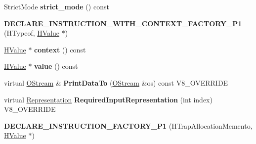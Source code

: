 \begin{DoxyCompactItemize}
\item 
\hypertarget{classv8_1_1internal_1_1_v8___f_i_n_a_l_a2aedf779fef90f5fec7b463341d87c42}{}Strict\+Mode {\bfseries strict\+\_\+mode} () const \label{classv8_1_1internal_1_1_v8___f_i_n_a_l_a2aedf779fef90f5fec7b463341d87c42}

\item 
\hypertarget{classv8_1_1internal_1_1_v8___f_i_n_a_l_a1b1a4e623508cb63ed8e01ba66e0dc85}{}{\bfseries D\+E\+C\+L\+A\+R\+E\+\_\+\+I\+N\+S\+T\+R\+U\+C\+T\+I\+O\+N\+\_\+\+W\+I\+T\+H\+\_\+\+C\+O\+N\+T\+E\+X\+T\+\_\+\+F\+A\+C\+T\+O\+R\+Y\+\_\+\+P1} (H\+Typeof, \hyperlink{classv8_1_1internal_1_1_h_value}{H\+Value} $\ast$)\label{classv8_1_1internal_1_1_v8___f_i_n_a_l_a1b1a4e623508cb63ed8e01ba66e0dc85}

\item 
\hypertarget{classv8_1_1internal_1_1_v8___f_i_n_a_l_a8294bece2df148267ec52228e2139030}{}\hyperlink{classv8_1_1internal_1_1_h_value}{H\+Value} $\ast$ {\bfseries context} () const \label{classv8_1_1internal_1_1_v8___f_i_n_a_l_a8294bece2df148267ec52228e2139030}

\item 
\hypertarget{classv8_1_1internal_1_1_v8___f_i_n_a_l_a998b3feae0e84bbe080297551603911f}{}\hyperlink{classv8_1_1internal_1_1_h_value}{H\+Value} $\ast$ {\bfseries value} () const \label{classv8_1_1internal_1_1_v8___f_i_n_a_l_a998b3feae0e84bbe080297551603911f}

\item 
\hypertarget{classv8_1_1internal_1_1_v8___f_i_n_a_l_ac450dad970b14246be761ccf5004924b}{}virtual \hyperlink{classv8_1_1internal_1_1_o_stream}{O\+Stream} \& {\bfseries Print\+Data\+To} (\hyperlink{classv8_1_1internal_1_1_o_stream}{O\+Stream} \&os) const V8\+\_\+\+O\+V\+E\+R\+R\+I\+D\+E\label{classv8_1_1internal_1_1_v8___f_i_n_a_l_ac450dad970b14246be761ccf5004924b}

\item 
\hypertarget{classv8_1_1internal_1_1_v8___f_i_n_a_l_a6c6d1f37f40b113d8f4062f1ffff7215}{}virtual \hyperlink{classv8_1_1internal_1_1_representation}{Representation} {\bfseries Required\+Input\+Representation} (int index) V8\+\_\+\+O\+V\+E\+R\+R\+I\+D\+E\label{classv8_1_1internal_1_1_v8___f_i_n_a_l_a6c6d1f37f40b113d8f4062f1ffff7215}

\item 
\hypertarget{classv8_1_1internal_1_1_v8___f_i_n_a_l_a8e2354309b43fcd5cb2f3afacc68d608}{}{\bfseries D\+E\+C\+L\+A\+R\+E\+\_\+\+I\+N\+S\+T\+R\+U\+C\+T\+I\+O\+N\+\_\+\+F\+A\+C\+T\+O\+R\+Y\+\_\+\+P1} (H\+Trap\+Allocation\+Memento, \hyperlink{classv8_1_1internal_1_1_h_value}{H\+Value} $\ast$)\label{classv8_1_1internal_1_1_v8___f_i_n_a_l_a8e2354309b43fcd5cb2f3afacc68d608}


\end{DoxyCompactItemize}
